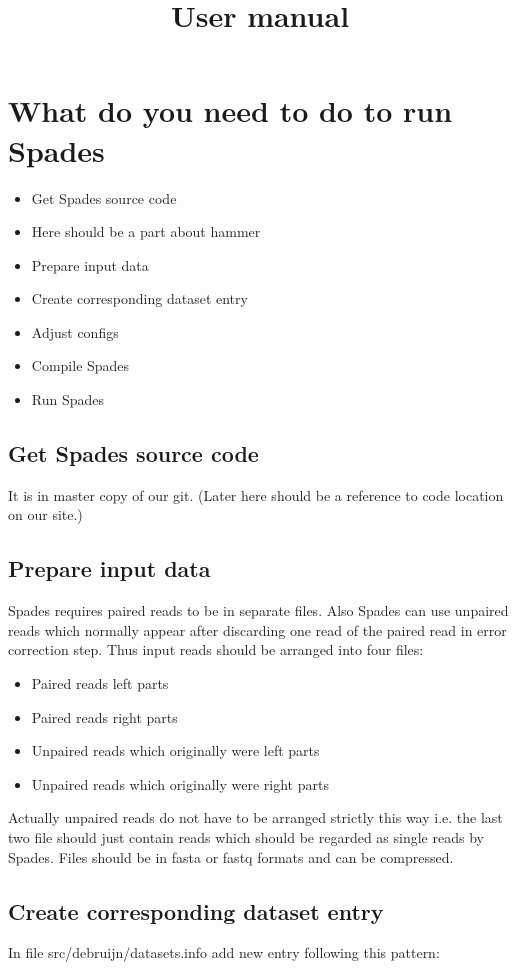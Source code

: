 \documentclass[a4paper,10pt]{article}
\title{User manual}
\begin{document}
\maketitle

\section{What do you need to do to run Spades}
\begin{itemize}
\item Get Spades source code
\item Here should be a part about hammer
\item Prepare input data
\item Create corresponding dataset entry
\item Adjust configs
\item Compile Spades
\item Run Spades
\end{itemize}

\subsection{Get Spades source code}
It is in master copy of our git. (Later here should be a reference to code location on our site.)

\subsection{Prepare input data}
Spades requires paired reads to be in separate files.
Also Spades can use unpaired reads which normally appear after discarding one read of the paired read in error correction step.
Thus input reads should be arranged into four files:
\begin{itemize}
 \item Paired reads left parts
 \item Paired reads right parts
 \item Unpaired reads which originally were left parts
 \item Unpaired reads which originally were right parts
\end{itemize}

Actually unpaired reads do not have to be arranged strictly this way i.e. the last two file should just contain reads which should be regarded as single reads by Spades.
Files should be in fasta or fastq formats and can be compressed.

\subsection{Create corresponding dataset entry}
In file src/debruijn/datasets.info add new entry following this pattern:
\end{document}
